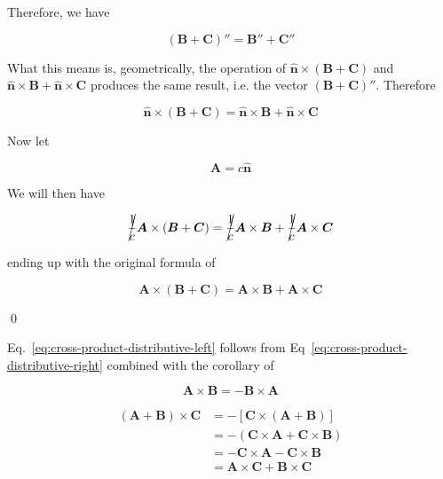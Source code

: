 Therefore, we have

\[
    (\boldsymbol{B} + \boldsymbol{C})'' = \boldsymbol{B}'' + \boldsymbol{C}''
\]

What this means is, geometrically, the operation of $\boldsymbol{\hat{n}} \times (\boldsymbol{B} + \boldsymbol{C})$ and
$\boldsymbol{\hat{n}} \times \boldsymbol{B} + \boldsymbol{\hat{n}} \times \boldsymbol{C}$ produces the same result, i.e.
the vector $(\boldsymbol{B} + \boldsymbol{C})''$. Therefore

\[
    \boldsymbol{\hat{n}} \times (\boldsymbol{B} + \boldsymbol{C}) = \boldsymbol{\hat{n}} \times \boldsymbol{B} + \boldsymbol{\hat{n}} \times \boldsymbol{C}
\]

Now let

\begin{equation}
    \boldsymbol{A} = c \boldsymbol{\hat{n}}
\end{equation}

We will then have

\[
    \cancel{\frac{1}{c}}\boldsymbol{A} \times (\boldsymbol{B} + \boldsymbol{C}) = \cancel{\frac{1}{c}}\boldsymbol{A} \times \boldsymbol{B} + \cancel{\frac{1}{c}}\boldsymbol{A} \times \boldsymbol{C}
\]

ending up with the original formula of

\[
    \boldsymbol{A} \times (\boldsymbol{B} + \boldsymbol{C}) = \boldsymbol{A} \times \boldsymbol{B} + \boldsymbol{A} \times \boldsymbol{C}
\]

\qed

Eq.~\ref{eq:cross-product-distributive-left} follows from Eq~\ref{eq:cross-product-distributive-right} combined with the
corollary of

\begin{equation}
    \boldsymbol{A} \times \boldsymbol{B} = - \boldsymbol{B} \times \boldsymbol{A}
\end{equation}

\begin{align*}
    (\boldsymbol{A} + \boldsymbol{B}) \times \boldsymbol{C} &= - \left[ \boldsymbol{C} \times (\boldsymbol{A} + \boldsymbol{B}) \right] \\
    &= - (\boldsymbol{C} \times \boldsymbol{A} + \boldsymbol{C} \times \boldsymbol{B}) \\
    &= - \boldsymbol{C} \times \boldsymbol{A} - \boldsymbol{C} \times \boldsymbol{B} \\
    &= \boldsymbol{A} \times \boldsymbol{C} + \boldsymbol{B} \times \boldsymbol{C}
\end{align*}

